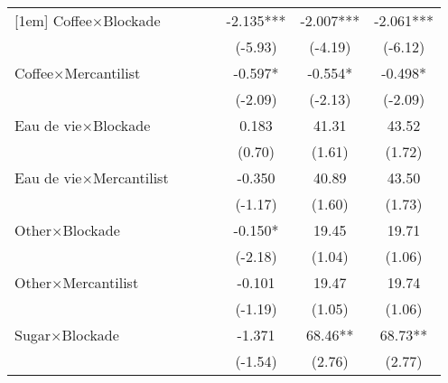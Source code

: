 {\begin{tabular}{l*{6}{c}}
[1em]
Coffee$\times$Blockade&                     &                     &                     &      -2.135***&      -2.007***&      -2.061***\\
                    &                     &                     &                     &     (-5.93)         &     (-4.19)         &     (-6.12)         \\
[1em]
Coffee$\times$Mercantilist&                     &                     &                     &      -0.597*  &      -0.554*  &      -0.498*  \\
                    &                     &                     &                     &     (-2.09)         &     (-2.13)         &     (-2.09)         \\
[1em]
Eau de vie$\times$Blockade&                     &                     &                     &       0.183         &       41.31         &       43.52         \\
                    &                     &                     &                     &      (0.70)         &      (1.61)         &      (1.72)         \\
[1em]
Eau de vie$\times$Mercantilist&                     &                     &                     &      -0.350         &       40.89         &       43.50         \\
                    &                     &                     &                     &     (-1.17)         &      (1.60)         &      (1.73)         \\
[1em]
Other$\times$Blockade&                     &                     &                     &      -0.150*  &       19.45         &       19.71         \\
                    &                     &                     &                     &     (-2.18)         &      (1.04)         &      (1.06)         \\
[1em]
Other$\times$Mercantilist&                     &                     &                     &      -0.101         &       19.47         &       19.74         \\
                    &                     &                     &                     &     (-1.19)         &      (1.05)         &      (1.06)         \\
[1em]
Sugar$\times$Blockade&                     &                     &                     &      -1.371         &       68.46** &       68.73** \\
                    &                     &                     &                     &     (-1.54)         &      (2.76)         &      (2.77)         \\

\end{tabular}}
